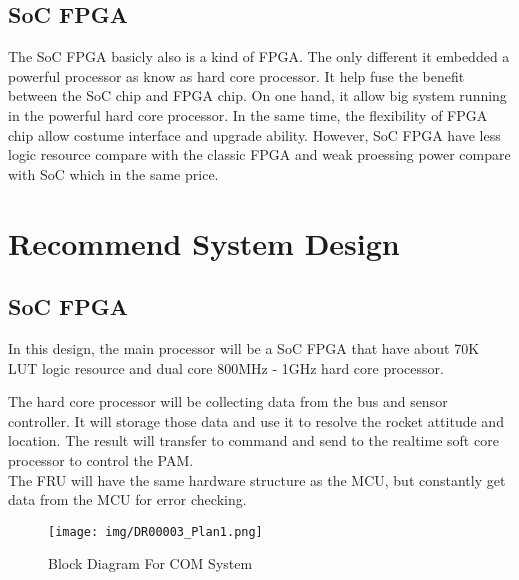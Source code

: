 \documentclass[12pt,article]{memoir}
\begin{document}
\section{SoC FPGA}
The SoC FPGA basicly also is a kind of FPGA. The only different it embedded a powerful processor as know as hard core processor. It help fuse the benefit between the SoC chip and FPGA chip. On one hand, it allow big system running in the powerful hard core processor. In the same time, the flexibility of FPGA chip allow costume interface and upgrade ability. However, SoC FPGA have less logic resource compare with the classic FPGA and weak proessing power compare with SoC which in the same price.
\newpage
\chapter{Recommend System Design}
\section{SoC FPGA}
In this design, the main processor will be a SoC FPGA that have about 70K LUT logic resource and dual core 800MHz - 1GHz hard core processor.
\begin{table}[H]
	\centering
	\caption{Table of Logic Resource}
	\label{tab:rev}
\end{table}
The hard core processor will be collecting data from the bus and sensor controller. It will storage those data and use it to resolve the rocket attitude and location. The result will transfer to command and send to the realtime soft core processor to control the PAM.\\
The FRU will have the same hardware structure as the MCU, but constantly get data from the MCU for error checking.
\begin{center}
\begin{figure}[htp]
\begin{center}
\texttt{[image: img/DR00003\_Plan1.png]}
 \caption{Block Diagram For COM System}	
\end{center}
\end{figure}
\end{center}

\end{document}
